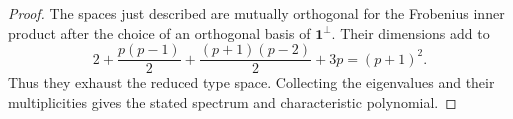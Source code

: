 \documentclass[10pt,a4paper]{amsart}
\newcommand{\one}{\mathbf{1}}
\begin{document}
\begin{proof}
		The spaces just described are mutually orthogonal for the Frobenius inner product after the choice of an orthogonal basis of $\one^{\perp}$. Their dimensions add to
		$$
		2+\frac{p(p-1)}{2}+\frac{(p+1)(p-2)}{2}+3p=(p+1)^2.
		$$
		Thus they exhaust the reduced type space. Collecting the eigenvalues and their multiplicities gives the stated spectrum and characteristic polynomial.
	\end{proof}
\end{document}
